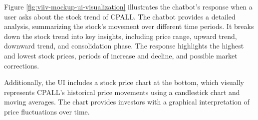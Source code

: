 Figure \ref{fig:viiv-mockup-ui-visualization} illustrates the chatbot’s response when
a user asks about the stock trend of CPALL. The chatbot provides a detailed analysis, 
summarizing the stock’s movement over different time periods. It breaks down the stock 
trend into key insights, including price range, upward trend, downward trend, 
and consolidation phase. The response highlights the highest and lowest stock prices, 
periods of increase and decline, and possible market corrections.

Additionally, the UI includes a stock price chart at the bottom, which visually 
represents CPALL’s historical price movements using a candlestick chart and moving averages. 
The chart provides investors with a graphical interpretation of price fluctuations over time.